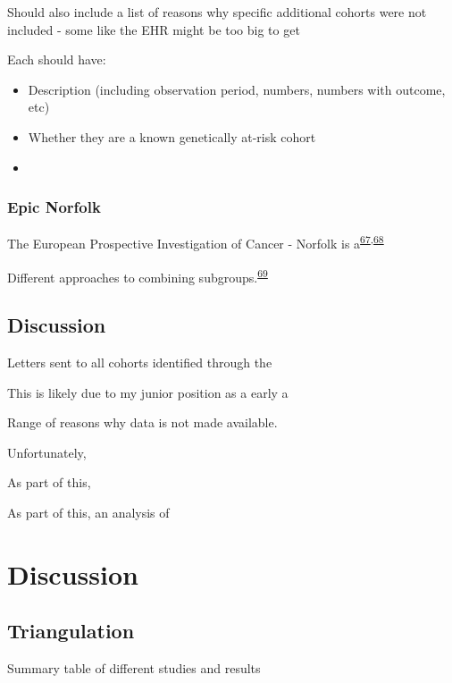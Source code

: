 \documentclass[a4paper, twoside]{templates/ociamthesis}
\providecommand{\tightlist}{%
  \setlength{\itemsep}{0pt}\setlength{\parskip}{0pt}}
\begin{document}
Should also include a list of reasons why specific additional cohorts were not included - some like the EHR might be too big to get

Each should have:

\begin{itemize}
\tightlist
\item
  Description (including observation period, numbers, numbers with outcome, etc)
\item
  Whether they are a known genetically at-risk cohort
\item
\end{itemize}

\hypertarget{epic-norfolk}{%
\subsection{Epic Norfolk}\label{epic-norfolk}}

The European Prospective Investigation of Cancer - Norfolk is a\textsuperscript{\protect\hyperlink{ref-riboli1997}{67},\protect\hyperlink{ref-riboli2002}{68}}

Different approaches to combining subgroups.\textsuperscript{\protect\hyperlink{ref-fisher2017}{69}}

\hypertarget{discussion-3}{%
\section{Discussion}\label{discussion-3}}

Letters sent to all cohorts identified through the

This is likely due to my junior position as a early a

Range of reasons why data is not made available.

Unfortunately,

As part of this,

As part of this, an analysis of

\hypertarget{discussion-heading}{%
\chapter{Discussion}\label{discussion-heading}}

\hypertarget{triangulation}{%
\section{Triangulation}\label{triangulation}}

Summary table of different studies and results
\end{document}
